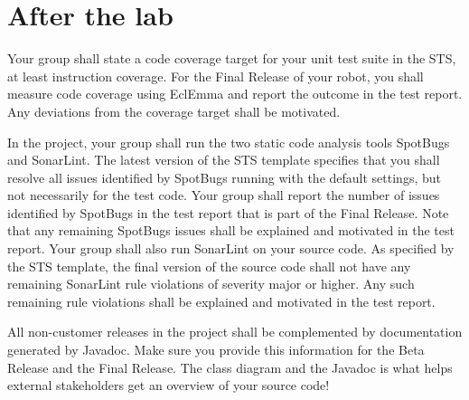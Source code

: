 \documentclass{scrreprt}
\begin{document}
\chapter{After the lab}
Your group shall state a code coverage target for your unit test suite in the STS, at least instruction coverage. For the Final Release of your robot, you shall measure code coverage using EclEmma and report the outcome in the test report. Any deviations from the coverage target shall be motivated.

In the project, your group shall run the two static code analysis tools SpotBugs and SonarLint. The latest version of the STS template specifies that you shall resolve all issues identified by SpotBugs running with the default settings, but not necessarily for the test code. Your group shall report the number of issues identified by SpotBugs in the test report that is part of the Final Release. Note that any remaining SpotBugs issues shall be explained and motivated in the test report. Your group shall also run SonarLint on your source code. As specified by the STS template, the final version of the source code shall not have any remaining SonarLint rule violations of severity major or higher. Any such remaining rule violations shall be explained and motivated in the test report.

All non-customer releases in the project shall be complemented by documentation generated by Javadoc. Make sure you provide this information for the Beta Release and the Final Release. The class diagram and the Javadoc is what helps external stakeholders get an overview of your source code!
\end{document}

